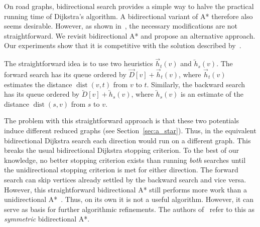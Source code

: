 \documentclass[manuscript,review]{acmart}
\newcommand*{\dist}{\operatorname{dist}}
\begin{document}
On road graphs, bidirectional search provides a simple way to halve the practical running time of Dijkstra's algorithm.
A bidirectional variant of A* therefore also seems desirable.
However, as shown in~\cite{gh-cspas-05}, the necessary modifications are not straightforward.
We revisit bidirectional A* and propose an alternative approach.
Our experiments show that it is competitive with the solution described by~\cite{gh-cspas-05}.

The straightforward idea is to use two heuristics $\overrightarrow{h}_t(v)$ and $\overleftarrow{h}_s(v)$.
The forward search has its queue ordered by $\overrightarrow{D}[v] + \overrightarrow{h}_t(v)$, where $\overrightarrow{h}_t(v)$ estimates the distance $\dist(v,t)$ from $v$ to $t$.
Similarly, the backward search has its queue ordered by $\overleftarrow{D}[v] + \overleftarrow{h}_s(v)$, where $\overleftarrow{h}_s(v)$ is an estimate of the distance $\dist(s,v)$ from $s$ to $v$.

The problem with this straightforward approach is that these two potentials induce different reduced graphs (see Section~\ref{sec:a_star}).
Thus, in the equivalent bidirectional Dijkstra search each direction would run on a different graph.
This breaks the usual bidirectional Dijkstra stopping criterion.
To the best of our knowledge, no better stopping criterion exists than running \emph{both} searches until the unidirectional stopping criterion is met for either direction.
The forward search can skip vertices already settled by the backward search and vice versa.
However, this straightforward bidirectional A* still performs more work than a unidirectional A*~\cite{gh-cspas-05}.
Thus, on its own it is not a useful algorithm.
However, it can serve as basis for further algorithmic refinements.
The authors of~\cite{gh-cspas-05} refer to this as \emph{symmetric} bidirectional A*.
\end{document}
